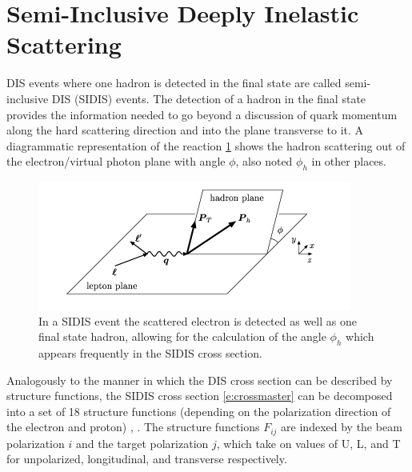 \section{Semi-Inclusive Deeply Inelastic Scattering}
DIS events where one hadron is detected in the final state are called semi-inclusive DIS (SIDIS) events.  The detection of a hadron in the final state provides the information needed to go beyond a discussion of quark momentum along the hard scattering direction and into the plane transverse to it.  A diagrammatic representation of the reaction \ref{fig:sidis} shows the hadron scattering out of the electron/virtual photon plane with angle $\phi$, also noted $\phi_h$ in other places.

\begin{figure}
	\centering
	\label{fig:sidis}
	\includegraphics[width = \textwidth]{image/diagrams/phi-hadron.png}	
	\caption[Diagrammatic representation of SIDIS with hadronic $\phi_h$ angle.]{In a SIDIS event the scattered electron is detected as well as one final state hadron, allowing for the calculation of the angle $\phi_h$ which appears frequently in the SIDIS cross section.}
\end{figure}

Analogously to the manner in which the DIS cross section can be described by structure functions, the SIDIS cross section \ref{e:crossmaster} can be decomposed into a set of 18 structure functions (depending on the polarization direction of the electron and proton) \cite{tmds-mulders:1995}, \cite{tmds-bacchetta:2006}.  The structure functions $F_{ij}$ are indexed by the beam polarization $i$ and the target polarization $j$, which take on values of U, L, and T for unpolarized, longitudinal, and transverse respectively.

